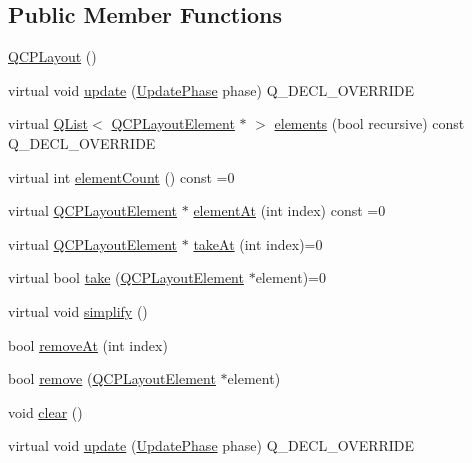 \subsection*{Public Member Functions}
\begin{DoxyCompactItemize}
\item 
\hyperlink{class_q_c_p_layout_a04222e6e1361fd802d48f1a25b7020d4}{Q\+C\+P\+Layout} ()
\item 
virtual void \hyperlink{class_q_c_p_layout_a48ecc9c98ea90b547c3e27a931a8f7bd}{update} (\hyperlink{class_q_c_p_layout_element_a0d83360e05735735aaf6d7983c56374d}{Update\+Phase} phase) Q\+\_\+\+D\+E\+C\+L\+\_\+\+O\+V\+E\+R\+R\+I\+DE
\item 
virtual \hyperlink{class_q_list}{Q\+List}$<$ \hyperlink{class_q_c_p_layout_element}{Q\+C\+P\+Layout\+Element} $\ast$ $>$ \hyperlink{class_q_c_p_layout_aca129722c019f91d3367046f80abfa77}{elements} (bool recursive) const Q\+\_\+\+D\+E\+C\+L\+\_\+\+O\+V\+E\+R\+R\+I\+DE
\item 
virtual int \hyperlink{class_q_c_p_layout_a39d3e9ef5d9b82ab1885ba1cb9597e56}{element\+Count} () const =0
\item 
virtual \hyperlink{class_q_c_p_layout_element}{Q\+C\+P\+Layout\+Element} $\ast$ \hyperlink{class_q_c_p_layout_afa73ca7d859f8a3ee5c73c9b353d2a56}{element\+At} (int index) const =0
\item 
virtual \hyperlink{class_q_c_p_layout_element}{Q\+C\+P\+Layout\+Element} $\ast$ \hyperlink{class_q_c_p_layout_a5a79621fa0a6eabb8b520cfc04fb601a}{take\+At} (int index)=0
\item 
virtual bool \hyperlink{class_q_c_p_layout_ada26cd17e56472b0b4d7fbbc96873e4c}{take} (\hyperlink{class_q_c_p_layout_element}{Q\+C\+P\+Layout\+Element} $\ast$element)=0
\item 
virtual void \hyperlink{class_q_c_p_layout_a41e6ac049143866e8f8b4964efab01b2}{simplify} ()
\item 
bool \hyperlink{class_q_c_p_layout_a2403f684fee3ce47132faaeed00bb066}{remove\+At} (int index)
\item 
bool \hyperlink{class_q_c_p_layout_a6c58f537d8086f352576ab7c5b15d0bc}{remove} (\hyperlink{class_q_c_p_layout_element}{Q\+C\+P\+Layout\+Element} $\ast$element)
\item 
void \hyperlink{class_q_c_p_layout_a02883bdf2769b5b227f0232dba1ac4ee}{clear} ()
\item 
virtual void \hyperlink{class_q_c_p_layout_a2dd1945e29217de03f27228f596d1304}{update} (\hyperlink{class_q_c_p_layout_element_a0d83360e05735735aaf6d7983c56374d}{Update\+Phase} phase) Q\+\_\+\+D\+E\+C\+L\+\_\+\+O\+V\+E\+R\+R\+I\+DE

\end{DoxyCompactItemize}
